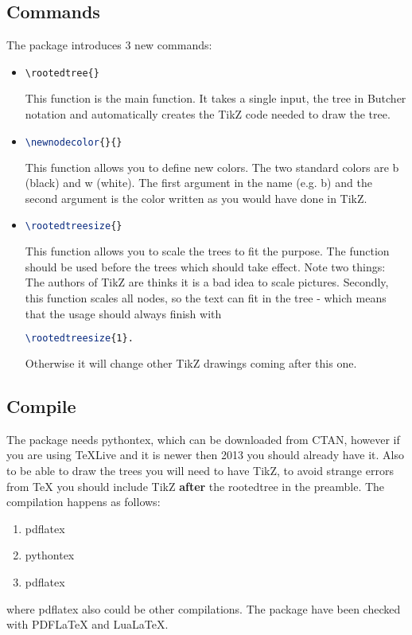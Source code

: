 \documentclass[11pt,a4paper]{article}
\begin{document}
\subsection{Commands}
The package introduces 3 new commands:
\begin{itemize}
\item 
\begin{lstlisting}  
\rootedtree{} 
\end{lstlisting}

This function is the main function. It takes a single input, the tree in Butcher notation and automatically creates the TikZ code needed to draw the tree.
\item 
\begin{lstlisting}[language={TeX}]  
\newnodecolor{}{}
\end{lstlisting}

This function allows you to define new colors. The two standard colors are b (black) and w (white). The first argument in the name (e.g. b) and the second argument is the color written as you would have done in TikZ. 
\item 
\begin{lstlisting}[language={TeX}]  
\rootedtreesize{}
\end{lstlisting}

This function allows you to scale the trees to fit the purpose. The function should be used before the trees which should take effect. Note two things: The authors of TikZ are thinks it is a bad idea to scale pictures. Secondly, this function scales all nodes, so the text can fit in the tree - which means that the usage should always finish with 
\begin{lstlisting}[language={TeX}]
\rootedtreesize{1}.
\end{lstlisting}
Otherwise it will change other TikZ drawings coming after this one.
\end{itemize}

\subsection{Compile}
The package needs pythontex, which can be downloaded from CTAN, however if you are using TeXLive and it is newer then 2013 you should already have it. Also to be able to draw the trees you will need to have TikZ, to avoid strange errors from TeX you should include TikZ \textbf{after} the rootedtree in the preamble. The compilation happens as follows:
\begin{enumerate}
\item pdflatex
\item pythontex
\item pdflatex
\end{enumerate}
where pdflatex also could be other compilations. The package have been checked with PDFLaTeX and LuaLaTeX.
\end{document}
